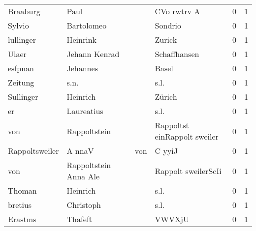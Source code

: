 \begin{center}
\begin{tiny}
\begin{longtabu}{llllrr}
                 Braaburg &                               Paul &             &                                 CVo rwtrv A &          0 &         1 \\
                   Sylvio &                         Bartolomeo &             &                                     Sondrio &          0 &         1 \\
                lullinger &                           Heinrink &             &                                      Zurick &          0 &         1 \\
                    Ulaer &                      Jehann Kenrad &             &                                Schaffhansen &          0 &         1 \\
                  esfpnan &                           Jehannes &             &                                       Basel &          0 &         1 \\
                  Zeitung &                               s.n. &             &                                        s.l. &          0 &         1 \\
                Sullinger &                           Heinrich &             &                                      Zürich &          0 &         1 \\
                       er &                         Laureatius &             &                                        s.l. &          0 &         1 \\
                      von &                       Rappoltstein &             &                Rappoltst einRappolt sweiler &          0 &         1 \\
           Rappoltsweiler &                             A nnaV &         von &                                      C yyiJ &          0 &         1 \\
                      von &              Rappoltstein Anna Ale &             &                         Rappolt sweilerScIi &          0 &         1 \\
                   Thoman &                           Heinrich &             &                                        s.l. &          0 &         1 \\
                  bretius &                          Christoph &             &                                        s.l. &          0 &         1 \\
                  Erastms &                            Thafeft &             &                                      VWVXjU &          0 &         1 \\

\end{longtabu}
\end{tiny}
\end{center}
